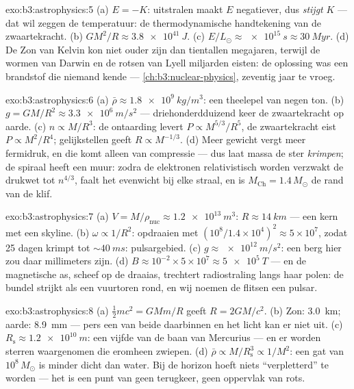 \begin{solution}{exo:b3:astrophysics:5}
(a) $E = -K$: uitstralen maakt $E$ negatiever, dus \emph{stijgt} $K$ ---
dat wil zeggen de temperatuur: de thermodynamische handtekening
van de zwaartekracht. (b) $GM^2/R \approx \qty{3.8e41}{J}$. (c)
$E/L_\odot \approx \qty{e15}{s} \approx \qty{30}{Myr}$. (d)
De Zon van Kelvin kon niet ouder zijn dan tientallen megajaren, terwijl de
wormen van Darwin en de rotsen van Lyell miljarden eisten: de
oplossing was een brandstof die niemand kende --- \cref{ch:b3:nuclear-physics},
zeventig jaar te vroeg.
\end{solution}

\begin{solution}{exo:b3:astrophysics:6}
(a) $\bar\rho \approx \qty{1.8e9}{kg/m^3}$: een theelepel van negen
ton. (b) $g = GM/R^2 \approx \qty{3.3e6}{m/s^2}$ --- driehonderd\-duizend
keer de zwaartekracht op aarde. (c) $n \propto M/R^3$:
de ontaarding levert $P \propto M^{5/3}/R^5$, de zwaartekracht eist
$P \propto M^2/R^4$; gelijkstellen geeft $R \propto M^{-1/3}$. (d) Meer
gewicht vergt meer fermidruk, en die komt alleen van compressie
--- dus laat massa de ster \emph{krimpen}; de spiraal heeft een
muur: zodra de elektronen relativistisch worden verzwakt de drukwet tot
$n^{4/3}$, faalt het evenwicht bij elke straal, en is
$M_{\text{Ch}} = 1.4\,M_\odot$ de rand van de klif.
\end{solution}

\begin{solution}{exo:b3:astrophysics:7}
(a) $V = M/\rho_{\text{nuc}} \approx \qty{1.2e13}{m^3}$:
$R \approx \qty{14}{km}$ --- een kern met een skyline. (b)
$\omega \propto 1/R^2$: opdraaien met $(10^8/1.4\times10^4)^2
\approx 5\times10^{7}$, zodat 25 dagen krimpt tot
${\sim}\qty{40}{ms}$: pulsargebied. (c) $g \approx
\qty{e12}{m/s^2}$: een berg hier zou daar millimeters zijn.
(d) $B \approx 10^{-2}\times5\times10^{7} \approx
\qty{5e5}{T}$ --- en de magnetische as, scheef op de
draaias, trechtert radiostraling langs haar polen: de bundel
strijkt als een vuurtoren rond, en wij noemen de flitsen een pulsar.
\end{solution}

\begin{solution}{exo:b3:astrophysics:8}
(a) $\tfrac12mc^2 = GMm/R$ geeft $R = 2GM/c^2$. (b) Zon:
\qty{3.0}{km}; aarde: \qty{8.9}{mm} --- pers een van beide daarbinnen
en het licht kan er niet uit. (c) $R_{\text{s}} \approx
\qty{1.2e10}{m}$: een vijfde van de baan van Mercurius --- en er worden sterren
waargenomen die eromheen zwiepen. (d) $\bar\rho \propto
M/R_{\text{s}}^3 \propto 1/M^2$: een gat van $10^8\,M_\odot$ is minder
dicht dan water. Bij de horizon hoeft niets ``verpletterd'' te worden ---
het is een punt van geen terugkeer, geen oppervlak van rots.
\end{solution}

